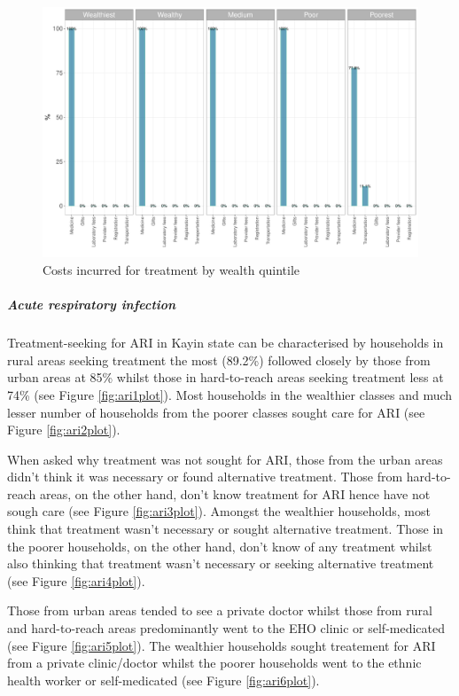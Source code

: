 \documentclass[12pt,a4paper]{article}
\let\oldsubparagraph\subparagraph
\renewcommand{\subparagraph}[1]{\oldsubparagraph{#1}\mbox{}}
\begin{document}
\begin{figure}[H]

{\centering \includegraphics{kayinReport_files/figure-latex/diarrhoea8plot-1} 

}

\caption{Costs incurred for treatment by wealth quintile}\label{fig:diarrhoea8plot}
\end{figure}

\hypertarget{ari}{%
\subparagraph{Acute respiratory infection}\label{ari}}

Treatment-seeking for ARI in Kayin state can be characterised by households in rural areas seeking treatment the most (89.2\%) followed closely by those from urban areas at 85\% whilst those in hard-to-reach areas seeking treatment less at 74\% (see Figure \ref{fig:ari1plot}). Most households in the wealthier classes and much lesser number of households from the poorer classes sought care for ARI (see Figure \ref{fig:ari2plot}).

When asked why treatment was not sought for ARI, those from the urban areas didn't think it was necessary or found alternative treatment. Those from hard-to-reach areas, on the other hand, don't know treatment for ARI hence have not sough care (see Figure \ref{fig:ari3plot}). Amongst the wealthier households, most think that treatment wasn't necessary or sought alternative treatment. Those in the poorer households, on the other hand, don't know of any treatment whilst also thinking that treatment wasn't necessary or seeking alternative treatment (see Figure \ref{fig:ari4plot}).

Those from urban areas tended to see a private doctor whilst those from rural and hard-to-reach areas predominantly went to the EHO clinic or self-medicated (see Figure \ref{fig:ari5plot}). The wealthier households sought treatement for ARI from a private clinic/doctor whilst the poorer households went to the ethnic health worker or self-medicated (see Figure \ref{fig:ari6plot}).
\end{document}
